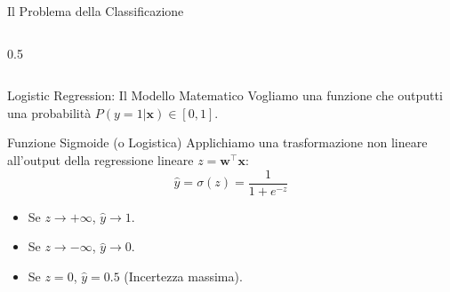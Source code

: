 \documentclass[aspectratio=169, 10pt]{beamer}
\begin{document}
\begin{frame}{Il Problema della Classificazione}
\begin{columns}[T]
\begin{column}{0.5\textwidth}
        \end{column}
    \end{columns}
\end{frame}

\begin{frame}{Logistic Regression: Il Modello Matematico}
    Vogliamo una funzione che outputti una probabilità $P(y=1|\mathbf{x}) \in [0, 1]$.
    
    \begin{block}{Funzione Sigmoide (o Logistica)}
        Applichiamo una trasformazione non lineare all'output della regressione lineare $z = \mathbf{w}^\top \mathbf{x}$:
        \[ \hat{y} = \sigma(z) = \frac{1}{1 + e^{-z}} \]
    \end{block}
    
    \begin{itemize}
        \item Se $z \to +\infty$, $\hat{y} \to 1$.
        \item Se $z \to -\infty$, $\hat{y} \to 0$.
        \item Se $z = 0$, $\hat{y} = 0.5$ (Incertezza massima).
    \end{itemize}
\end{frame}
\end{document}
